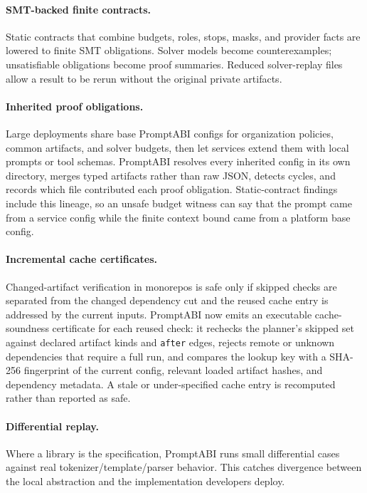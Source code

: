 \documentclass[10pt]{article}
\begin{document}
\paragraph{SMT-backed finite contracts.}
Static contracts that combine budgets, roles, stops, masks, and provider facts
are lowered to finite SMT obligations. Solver models become counterexamples;
unsatisfiable obligations become proof summaries. Reduced solver-replay files
allow a result to be rerun without the original private artifacts.

\paragraph{Inherited proof obligations.}
Large deployments share base PromptABI configs for organization policies, common
artifacts, and solver budgets, then let services extend them with local prompts
or tool schemas. PromptABI resolves every inherited config in its own directory,
merges typed artifacts rather than raw JSON, detects cycles, and records which
file contributed each proof obligation. Static-contract findings include this
lineage, so an unsafe budget witness can say that the prompt came from a service
config while the finite context bound came from a platform base config.

\paragraph{Incremental cache certificates.}
Changed-artifact verification in monorepos is safe only if skipped checks are
separated from the changed dependency cut and the reused cache entry is addressed
by the current inputs. PromptABI now emits an executable cache-soundness
certificate for each reused check: it rechecks the planner's skipped set against
declared artifact kinds and \texttt{after} edges, rejects remote or unknown
dependencies that require a full run, and compares the lookup key with a
SHA-256 fingerprint of the current config, relevant loaded artifact hashes, and
dependency metadata. A stale or under-specified cache entry is recomputed rather
than reported as safe.

\paragraph{Differential replay.}
Where a library is the specification, PromptABI runs small differential cases
against real tokenizer/template/parser behavior. This catches divergence between
the local abstraction and the implementation developers deploy.
\end{document}
